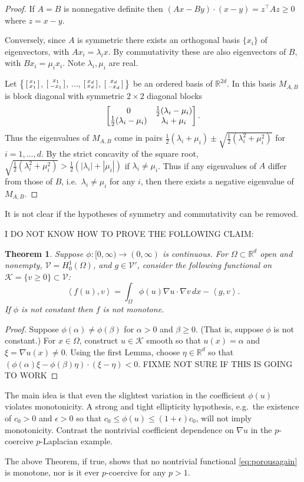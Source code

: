 \documentclass[letterpaper,final,12pt,reqno]{amsart}
\theoremstyle{cstyle}
\newtheorem{theorem}{Theorem}
\theoremstyle{cstyle*}
\theoremstyle{dstyle}
\numberwithin{equation}{section}
\numberwithin{figure}{section}
\numberwithin{table}{section}
\numberwithin{theorem}{section}
\newcommand{\eps}{\epsilon}
\newcommand{\RR}{\mathbb{R}}
\newcommand{\grad}{\nabla}
\newcommand{\cK}{\mathcal{K}}
\newcommand{\cV}{\mathcal{V}}
\newcommand{\ip}[2]{\left<#1,#2\right>}
\begin{document}
\begin{proof}
If $A=B$ is nonnegative definite then $(Ax - By)\cdot (x-y) = z^\top A z\ge 0$ where $z=x-y$.

Conversely, since $A$ is symmetric there exists an orthogonal basis $\{x_i\}$ of eigenvectors, with $Ax_i = \lambda_i x$.  By commutativity these are also eigenvectors of $B$, with $Bx_i = \mu_i x_i$.  Note $\lambda_i,\mu_i$ are real.

Let $\big\{\left[\begin{smallmatrix} x_1 \\ x_1 \end{smallmatrix}\right]$, $\left[\begin{smallmatrix} x_1 \\ -x_1 \end{smallmatrix}\right]$, $\dots$, $\left[\begin{smallmatrix} x_d \\ x_d \end{smallmatrix}\right]$, $\left[\begin{smallmatrix} x_d \\ -x_d \end{smallmatrix}\right]\big\}$ be an ordered basis of $\RR^{2d}$.  In this basis $M_{A,B}$ is block diagonal with symmetric $2\times 2$ diagonal blocks
   $$\left[\begin{matrix} 0 & \frac{1}{2}(\lambda_i-\mu_i) \\ \frac{1}{2}(\lambda_i-\mu_i) & \lambda_i+\mu_i \end{matrix}\right].$$
Thus the eigenvalues of $M_{A,B}$ come in pairs $\frac{1}{2}(\lambda_i + \mu_i) \pm \sqrt{\frac{1}{2}(\lambda_i^2 + \mu_i^2)}$ for $i=1,\dots,d$.  By the strict concavity of the square root, $\sqrt{\frac{1}{2}(\lambda_i^2 + \mu_i^2)} > \frac{1}{2}(|\lambda_i| + |\mu_i|)$ if $\lambda_i\ne \mu_i$.  Thus if any eigenvalues of $A$ differ from those of $B$, i.e.~$\lambda_i\ne \mu_i$ for any $i$, then there exists a negative eigenvalue of $M_{A,B}$.
\end{proof}

It is not clear if the hypotheses of symmetry and commutativity can be removed.

I DO NOT KNOW HOW TO PROVE THE FOLLOWING CLAIM:

\begin{theorem}
Suppose $\phi:[0,\infty) \to (0,\infty)$ is continuous.  For $\Omega \subset \RR^d$ open and nonempty, $\cV = H_0^1(\Omega)$, and $g\in \cV'$, consider the following functional on $\cK = \{v\ge 0\} \subset \cV$:
\begin{equation}
\ip{f(u)}{v} = \int_\Omega \phi(u) \grad u\cdot \grad v\,dx - \ip{g}{v}.  \label{eq:porousagain}
\end{equation}
If $\phi$ is not constant then $f$ is not monotone.
\end{theorem}

\begin{proof}
Suppose $\phi(\alpha)\ne \phi(\beta)$ for $\alpha > 0$ and $\beta \ge 0$.  (That is, suppose $\phi$ is not constant.)  For $x\in\Omega$, construct $u\in \cK$ smooth so that $u(x)=\alpha$ and $\xi = \grad u(x) \ne 0$.  Using the first Lemma, choose $\eta \in \RR^d$ so that $(\phi(\alpha) \xi - \phi(\beta) \eta) \cdot (\xi - \eta) < 0$.  FIXME NOT SURE IF THIS IS GOING TO WORK
\end{proof}

The main idea is that even the slightest variation in the coefficient $\phi(u)$ violates monotonicity.  A strong and tight ellipticity hypothesis, e.g.~the existence of $c_0>0$ and $\eps>0$ so that $c_0 \le \phi(u) \le (1+\eps)c_0$, will not imply monotonicity.  Contrast the nontrivial coefficient dependence on $\grad u$ in the $p$-coercive $p$-Laplacian example.

The above Theorem, if true, shows that no nontrivial functional \eqref{eq:porousagain} is monotone, nor is it ever $p$-coercive for any $p>1$.



\end{document}
